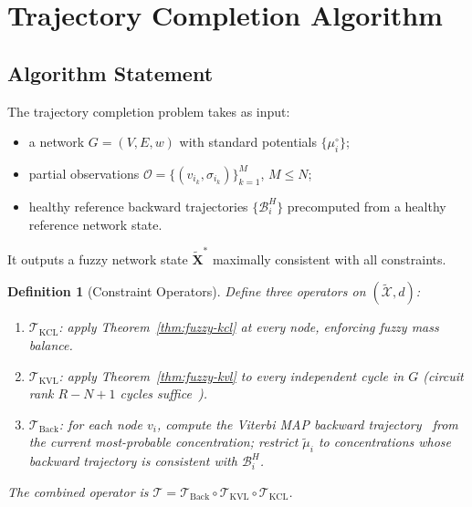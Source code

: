 \documentclass[twocolumn,10pt,a4paper]{article}
\newcommand{\Back}{\mathcal{B}}
\newtheorem{definition}[theorem]{Definition}
\begin{document}
\section{Trajectory Completion Algorithm}
\label{sec:algorithm}

\subsection{Algorithm Statement}
\label{sec:alg-statement}

The trajectory completion problem takes as input:
\begin{itemize}[noitemsep]
  \item a network $G=(V,E,w)$ with standard potentials $\{\mu_i^\circ\}$;
  \item partial observations
        $\mathcal{O}=\{(v_{i_k},\sigma_{i_k})\}_{k=1}^M$, $M\leq N$;
  \item healthy reference backward trajectories $\{\Back_i^H\}$ precomputed
        from a healthy reference network state.
\end{itemize}
It outputs a fuzzy network state $\widetilde{\mathbf{X}}^*$ maximally
consistent with all constraints.

\begin{definition}[Constraint Operators]
\label{def:operators}
Define three operators on $(\widetilde{\mathcal{X}},d)$:
\begin{enumerate}[label=(\roman*),noitemsep]
  \item $\mathcal{T}_{\mathrm{KCL}}$: apply Theorem~\ref{thm:fuzzy-kcl} at
        every node, enforcing fuzzy mass balance.
  \item $\mathcal{T}_{\mathrm{KVL}}$: apply Theorem~\ref{thm:fuzzy-kvl} to
        every independent cycle in $G$ (circuit rank $R-N+1$ cycles
        suffice~\cite{HeinrichSchuster1996}).
  \item $\mathcal{T}_{\mathrm{Back}}$: for each node $v_i$, compute the
        Viterbi MAP backward trajectory~\cite{Viterbi1967,Forney1973} from
        the current most-probable concentration; restrict $\tilde{\mu}_i$ to
        concentrations whose backward trajectory is consistent with $\Back_i^H$.
\end{enumerate}
The combined operator is
$\mathcal{T}=\mathcal{T}_{\mathrm{Back}}\circ
\mathcal{T}_{\mathrm{KVL}}\circ\mathcal{T}_{\mathrm{KCL}}$.
\end{definition}
\end{document}
